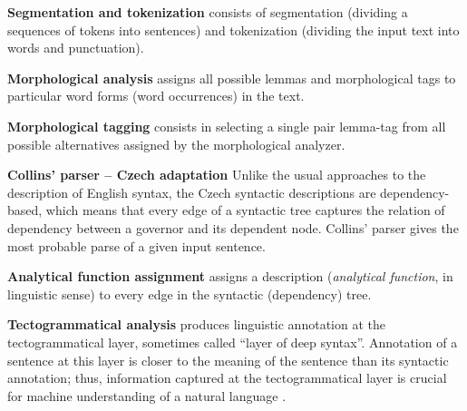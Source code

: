 \begin{description}
 
	\item \textbf{Segmentation and tokenization} consists of segmentation (dividing a sequences of tokens into sentences) and tokenization (dividing the input text into words and punctuation).
		
	\item \textbf{Morphological analysis} \citep{biblio:HajicMorfTag} assigns all possible lemmas and morphological tags to particular word forms (word 
occurrences) in the text.
	
	\item \textbf{Morphological tagging} \citep{biblio:HajicMorfTag} consists in selecting a single pair lemma-tag from all possible alternatives assigned 
by the morphological analyzer.
	
	\item \textbf{Collins' parser -- Czech adaptation} \citep{biblio:collinshbrt_1999} Unlike the usual approaches to the description of 
English syntax, the Czech syntactic descriptions are dependency-based, which means that every edge of a syntactic tree captures the relation of dependency between a governor and its dependent node. Collins' parser gives the most probable parse of a given input sentence.
	
	\item \textbf{Analytical function assignment} \citep{biblio:AlyticAsign} assigns a description (\emph{analytical function}, in linguistic sense) to every edge in the syntactic (dependency) tree.
	
	\item \textbf{Tectogrammatical analysis} produces linguistic annotation at the tectogrammatical layer, sometimes called ``layer of deep syntax''. 
	Annotation of a sentence at this layer is closer to the meaning of the sentence than its syntactic annotation; thus, information captured at the tectogrammatical layer is crucial for machine understanding of a natural language \citep{biblio:KlTransformationBasedTectogrammatical2006}.
\end{description}

